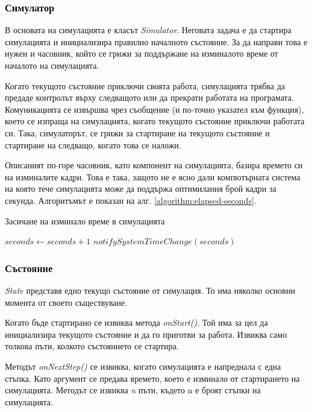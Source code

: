 		\subsubsection{Симулатор}		
		
		В основата на симулацията е класът \emph{Simulator}. Неговата задача е да стартира симулацията
		и инициализира правилно началното състояние. За да направи това е нужен и часовник, който се грижи
		за поддържане на изминалото време от началото на симулацията. 
		
		Когато текущото състояние приключи своята работа, симулацията трябва да предаде контролът върху следващото или да прекрати работата
		на програмата. Комуникацията се извършва чрез съобщение (и по-точно указател към функция), което
		се изпраща на симулацията, когато текущото състояние приключи работата си. Така, симулаторът,
		се грижи за стартиране на текущото състояние и стартиране на следващо, когато това се наложи.
		
		Описаният по-горе часовник, като компонент на симулацията, базира времето си
		на изминалите кадри. Това е така, защото не е ясно дали компютърната система
		на която тече симулацията може да поддържа оптимилания брой кадри за секунда.
		Алгоритъмът е показан на алг. \ref{algorithm:elapsed-seconds}.

		\begin{algorithm}				
			\caption{Засичане на изминало време в симулацията}				
			\label{algorithm:elapsed-seconds}
			\begin{algorithmic}
					\State $seconds\gets seconds+1$
					\State $notifySystemTimeChange(seconds)$
				\EndIf
			\end{algorithmic}
		\end{algorithm}
		
		\subsubsection{Състояние}					
		
			\emph{State} представя едно текущо състояние от симулация. То има няколко основни момента от своето съществуване.
			 
			Когато бъде стартирано се извиква метода \emph{onStart()}. Той има за цел да инициализира текущото състояние и да го приготви за работа.
			Извиква само толкова пъти, колкото състоянието се стартира. 
			
			Методът \emph{onNextStep()} се извиква, когато симулацията е напреднала 
			с една стъпка. Като аргумент се предава времето, което е изминало от стартирането на симулацията. 
			Методът се извиква \emph{n} пъти, където n е броят стъпки на симулацията. 
			

